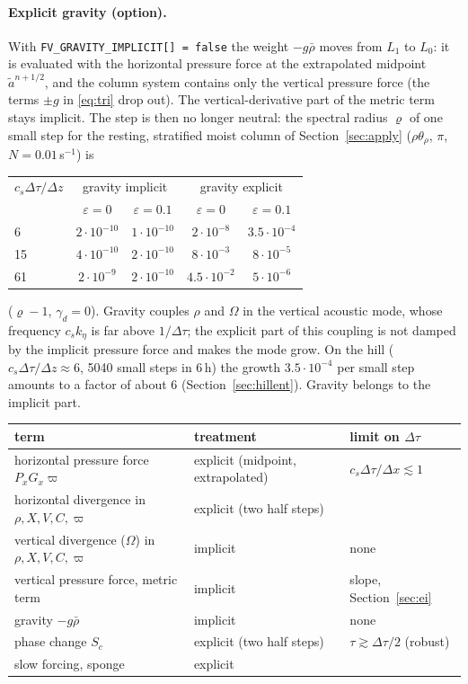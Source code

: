 \documentclass[11pt,a4paper]{article}
\newcommand{\dtau}{\Delta\tau}
\newcommand{\code}[1]{\texttt{\small #1}}
\newcommand{\pv}{\varpi}      %
\begin{document}
\paragraph{Explicit gravity (option).} With \code{FV\_GRAVITY\_IMPLICIT[] = false} the weight $-g\bar\rho$ moves from $L_1$ to $L_0$:
it is evaluated with the horizontal pressure force at the extrapolated midpoint $\tilde a^{n+1/2}$, and the column system contains
only the vertical pressure force (the terms $\pm g$ in \eqref{eq:tri} drop out). The vertical-derivative part of the metric term
stays implicit. The step is then no longer neutral: the spectral radius $\varrho$ of one small step for the resting, stratified
moist column of Section~\ref{sec:apply} ($\rho\theta_\rho$, $\pi$, $N=0.01$\,s$^{-1}$) is
\begin{center}\small
\begin{tabular}{lcccc}\toprule
$c_s\dtau/\Delta z$ & \multicolumn{2}{c}{gravity implicit} & \multicolumn{2}{c}{gravity explicit}\\
& $\varepsilon=0$ & $\varepsilon=0.1$ & $\varepsilon=0$ & $\varepsilon=0.1$\\\midrule
6 & $2\cdot10^{-10}$ & $1\cdot10^{-10}$ & $2\cdot10^{-8}$ & $3.5\cdot10^{-4}$\\
15 & $4\cdot10^{-10}$ & $2\cdot10^{-10}$ & $8\cdot10^{-3}$ & $8\cdot10^{-5}$\\
61 & $2\cdot10^{-9}$ & $2\cdot10^{-10}$ & $4.5\cdot10^{-2}$ & $5\cdot10^{-6}$\\\bottomrule
\end{tabular}
\end{center}
($\varrho-1$, $\gamma_d=0$). Gravity couples $\rho$ and $\Omega$ in the vertical acoustic mode, whose frequency $c_sk_\eta$ is far above $1/\dtau$;
the explicit part of this coupling is not damped by the implicit pressure force and makes the mode grow. On the hill
($c_s\dtau/\Delta z\approx6$, 5040 small steps in 6\,h) the growth $3.5\cdot10^{-4}$ per small step amounts to a factor of about 6
(Section~\ref{sec:hillent}). Gravity belongs to the implicit part.

\begin{center}\small
\begin{tabular}{lll}\toprule
term & treatment & limit on $\dtau$\\\midrule
horizontal pressure force $P_xG_x\pv$ & explicit (midpoint, extrapolated) & $c_s\dtau/\Delta x\lesssim1$\\
horizontal divergence in $\rho,X,V,C,\pv$ & explicit (two half steps) & \\
vertical divergence ($\Omega$) in $\rho,X,V,C,\pv$ & implicit & none\\
vertical pressure force, metric term & implicit & slope, Section~\ref{sec:ei}\\
gravity $-g\bar\rho$ & implicit & none\\
phase change $S_c$ & explicit (two half steps) & $\tau\gtrsim\dtau/2$ (robust)\\
slow forcing, sponge & explicit & \\\bottomrule
\end{tabular}
\end{center}
\end{document}
